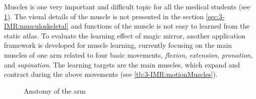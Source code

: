 Muscles is one very important and difficult topic for all the medical students (see \figurename{\ref{fig:3-IMR:armAnatomy}}). The visual details of the muscle is not presented in the section \ref{sec:3-IMR:musculoskeletal} and functions of the muscle is not easy to learned from the static atlas.  
To evaluate the learning effect of magic mirror, another application framework is developed for muscle learning, currently focusing on the main muscles of one arm related to four basic movements, \textit{flexion}, \textit{extension}, \textit{pronation}, and \textit{supination}. 
The learning targets are the main muscles, which expand and contract during the above movements (see \tablename{\ref{tb:3-IMR:motionMuscles}}).
\begin{figure}
	\centering
	\caption{Anatomy of the arm}
	\label{fig:3-IMR:armAnatomy}
\end{figure}
